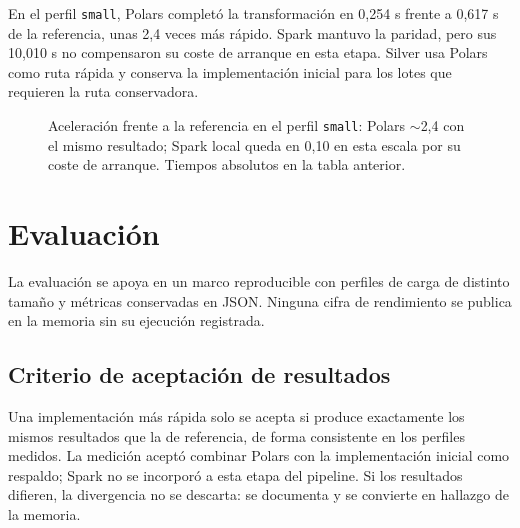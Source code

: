 \documentclass[11pt,a4paper]{article}
\begin{document}
En el perfil \texttt{small}, Polars completó la transformación en 0,254 s
frente a 0,617 s de la referencia, unas 2,4 veces más rápido. Spark mantuvo la
paridad, pero sus 10,010 s no compensaron su coste de arranque en esta etapa.
Silver usa Polars como ruta rápida y conserva la implementación inicial para
los lotes que requieren la ruta conservadora.

\begin{figure}[ht]
\centering
{}
\caption{Aceleración frente a la referencia en el perfil \texttt{small}:
Polars $\sim$2,4\texttimes{} con el mismo resultado; Spark local queda en
0,10\texttimes{} en esta escala por su coste de arranque. Tiempos
absolutos en la tabla anterior.}
\end{figure}

\clearpage
\section{Evaluación}

La evaluación se apoya en un marco reproducible con perfiles de carga de
distinto tamaño y métricas conservadas en JSON. Ninguna cifra de rendimiento
se publica en la memoria sin su ejecución registrada.

\subsection{Criterio de aceptación de resultados}

Una implementación más rápida solo se acepta si produce exactamente los mismos
resultados que la de referencia, de forma consistente en los perfiles medidos.
La medición aceptó combinar Polars con la implementación inicial como respaldo;
Spark no se incorporó a esta etapa del pipeline. Si los resultados difieren,
la divergencia no se descarta: se documenta y se convierte en hallazgo de la
memoria.
\end{document}
